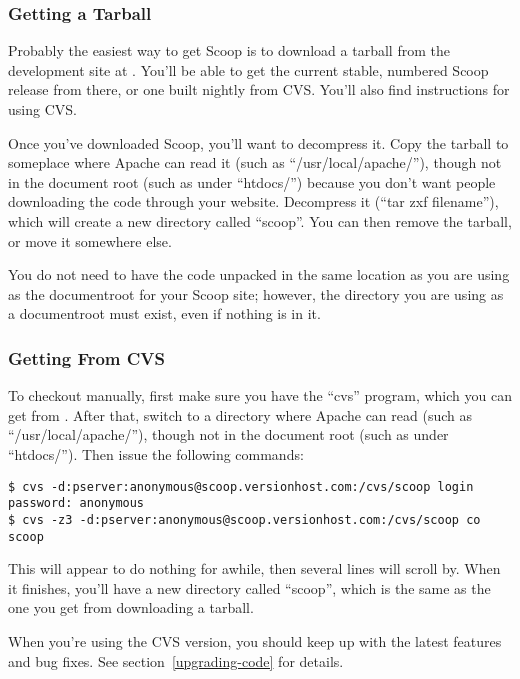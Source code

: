 \subsubsection{Getting a Tarball}

Probably the easiest way to get Scoop is to download a tarball from the development site at . You'll be able to get the current stable, numbered Scoop release from there, or one built nightly from CVS. You'll also find instructions for using CVS.

Once you've downloaded Scoop, you'll want to decompress it. Copy the tarball to someplace where Apache can read it (such as ``/usr/local/apache/''), though not in the document root (such as under ``htdocs/'') because you don't want people downloading the code through your website. Decompress it (``tar zxf \latexhtml{$<$}{<}filename\latexhtml{$>$}{>}''), which will create a new directory called ``scoop''. You can then remove the tarball, or move it somewhere else.

You do not need to have the code unpacked in the same location as you are using as the documentroot for your Scoop site; however, the directory you are using as a documentroot must exist, even if nothing is in it.  

\subsubsection{Getting From CVS}

To checkout manually, first make sure you have the ``cvs'' program, which you can get from . After that, switch to a directory where Apache can read (such as ``/usr/local/apache/''), though not in the document root (such as under ``htdocs/''). Then issue the following commands:

\begin{verbatim}
$ cvs -d:pserver:anonymous@scoop.versionhost.com:/cvs/scoop login
password: anonymous
$ cvs -z3 -d:pserver:anonymous@scoop.versionhost.com:/cvs/scoop co scoop
\end{verbatim}

This will appear to do nothing for awhile, then several lines will scroll by. When it finishes, you'll have a new directory called ``scoop'', which is the same as the one you get from downloading a tarball.

When you're using the CVS version, you should keep up with the latest features and bug fixes.  See section~\ref{upgrading-code} for details.

